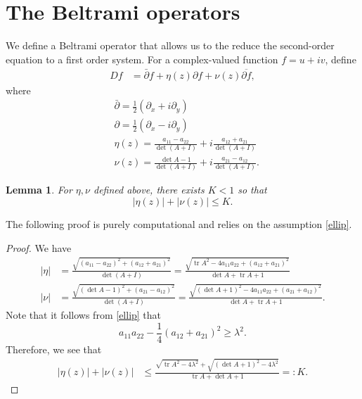 \documentclass[12pt,reqno]{amsart}
\theoremstyle{plain}
\newtheorem{lem}{Lemma}
\theoremstyle{definition}
\DeclareMathOperator{\tr}{tr}
\newcommand{\ol}{\overline}
\newcommand{\del}{ \partial}
\newcommand{\abs}[1]{\left\vert#1\right\vert}
\newcommand{\pr}[1]{\left( #1 \right) }
\begin{document}
\section{The Beltrami operators}
\label{S4}

We define a Beltrami operator that allows us to the reduce the second-order equation to a first order system.
For a complex-valued function $f = u + i v$, define 
\begin{align}
D f &=  \bar\del f + \eta\pr{z} \del f + \nu\pr{z} \ol{\del f} ,
\label{DDef} 
\end{align}
where 
\begin{align}
& \bar \del = \tfrac{1}{2} \pr{\del_x + i \del_y} \nonumber \\
&  \del = \tfrac{1}{2} \pr{\del_x - i \del_y} \nonumber \\
& \eta\pr{z} = \frac{a_{11} - a_{22} }{\det\pr{A + I}}  + i \frac{a_{12} + a_{21}}{\det\pr{A+I}}
\label{etaDef} \\
& \nu\pr{z} = \frac{\det A - 1}{\det\pr{A + I}} + i \frac{a_{21} - a_{12}}{\det\pr{A+I}}
\label{nuDef}.
\end{align}

\begin{lem}
For $\eta, \nu$ defined above, there exists $K < 1$ so that
$$\abs{\eta\pr{z}} + \abs{\nu\pr{z}} \le K.$$
\label{etanuBds}
\end{lem}

The following proof is purely computational and relies on the assumption \eqref{ellip}.

\begin{proof}
We have 
\begin{align*}
\abs{\eta} 
&= \frac{\sqrt{\pr{a_{11} - a_{22}}^2 + \pr{a_{12} + a_{21}}^2 }}{\det\pr{ A + I}}
= \frac{\sqrt{ \tr A^2 - 4 a_{11} a_{22} + \pr{a_{12} + a_{21}}^2 }}{\det A + \tr A + 1} \\
\abs{\nu}
&= \frac{\sqrt{\pr{\det A -1}^2 + \pr{a_{21} - a_{12}}^2 }}{\det\pr{ A + I}}
= \frac{\sqrt{\pr{\det A +1}^2 - 4 a_{11}a_{22} +  \pr{a_{21} + a_{12}}^2 }}{\det A + \tr A + 1}.
\end{align*}
Note that it follows from \eqref{ellip} that
\[
a_{11}a_{22}-\frac 14(a_{12}+a_{21})^2\ge\lambda^2.
\]
Therefore, we see that
\begin{align*}
\abs{\eta\pr{z}} + \abs{\nu\pr{z}}
&\le \frac{\sqrt{ \tr A^2 - 4\lambda^2 } + \sqrt{\pr{\det A +1}^2 - 4\lambda^2 }}{\tr A + \det A + 1} =: K.
\end{align*}
\end{proof}
\end{document}
